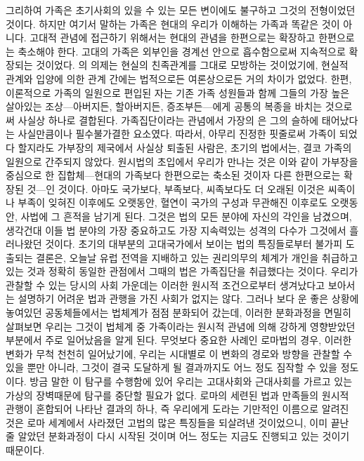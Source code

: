 그리하여 가족은 초기사회의 있을 수 있는 모든 변이에도 불구하고
그것의 전형이었던 것이다.
하지만 여기서 말하는 가족은 현대의 우리가 이해하는 가족과 똑같은 것이 아니다.
고대적 관념에 접근하기 위해서는 현대의 관념을 한편으로는 확장하고
한편으로는 축소해야 한다.
고대의 가족은
외부인을 경계선 안으로 흡수함으로써
지속적으로 확장되는 것이었다.
의 의제는 현실의 친족관계를 그대로 모방하는 것이었기에,
현실적 관계와 입양에 의한 관계 간에는
법적으로든 여론상으로든
거의 차이가 없었다.
한편, 이론적으로 가족의 일원으로 편입된 자는
기존 가족 성원들과 함께 그들의 가장 높은 살아있는 조상---아버지든,
할아버지든, 증조부든---에게
공통의 복종을 바치는 것으로써 사실상 하나로 결합된다.
가족집단이라는 관념에서 가장의 은
그의 슬하에 태어났다는 사실만큼이나
필수불가결한 요소였다.
따라서, 아무리 진정한 핏줄로써 가족이 되었다 할지라도
가부장의 제국에서 사실상 퇴출된 사람은,
초기의 법에서는,
결코 가족의 일원으로 간주되지 않았다.
원시법의 초입에서 우리가 만나는 것은
이와 같이 가부장을 중심으로 한 집합체---현대의 가족보다
한편으로는 축소된 것이자 다른 한편으로는 확장된 것---인 것이다.
아마도 국가보다, 부족보다, 씨족보다도 더 오래된 이것은
씨족이나 부족이 잊혀진 이후에도 오랫동안,
혈연이 국가의 구성과 무관해진 이후로도 오랫동안,
사법에 그 흔적을 남기게 된다.
그것은 법의 모든 분야에 자신의 각인을 남겼으며,
생각건대 이들 법 분야의 가장 중요하고도 가장 지속력있는 성격의 다수가
그것에서 흘러나왔던 것이다.
초기의 대부분의 고대국가에서 보이는 법의 특징들로부터 불가피 도출되는 결론은,
오늘날 유럽 전역을 지배하고 있는 권리의무의 체계가 개인을 취급하고 있는 것과
정확히 동일한 관점에서 그때의 법은 가족집단을 취급했다는 것이다.
우리가 관찰할 수 있는 당시의 사회 가운데는
이러한 원시적 조건으로부터 생겨났다고 보아서는
설명하기 어려운 법과 관행을 가진 사회가 없지는 않다.
그러나 보다 운 좋은 상황에 놓여있던 공동체들에서는
법체계가 점점 분화되어 갔는데,
이러한 분화과정을 면밀히 살펴보면
우리는
그것이 법체계 중 가족이라는 원시적 관념에 의해 강하게 영향받았던 부분에서
주로 일어났음을 알게 된다.
무엇보다 중요한 사례인 로마법의 경우,
이러한 변화가 무척 천천히 일어났기에,
우리는 시대별로 이 변화의 경로와 방향을 관찰할 수 있을 뿐만 아니라,
그것이 결국 도달하게 될 결과까지도 어느 정도 짐작할 수 있을
정도이다.
방금 말한 이 탐구를 수행함에 있어 우리는 고대사회와 근대사회를
가르고 있는 가상의 장벽때문에 탐구를 중단할 필요가 없다.
로마의 세련된 법과 만족들의 원시적 관행이 혼합되어
나타난 결과의 하나, 즉 우리에게 도라는 기만적인 이름으로 알려진 것은
로마 세계에서 사라졌던 고법의 많은 특징들을 되살려낸 것이었으니,
이미 끝난 줄 알았던 분화과정이 다시 시작된 것이며 어느 정도는 지금도
진행되고 있는 것이기 때문이다.


